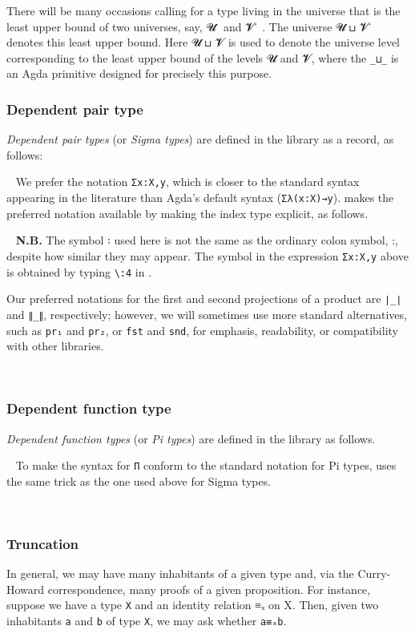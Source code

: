 \begin{code}
There will be many occasions calling for a type living in the universe that is the least upper bound of two universes, say, 𝓤 ̇ and 𝓥 ̇ . The universe 𝓤 ⊔ 𝓥 ̇ denotes this least upper bound. Here 𝓤 ⊔ 𝓥 is used to denote the universe level corresponding to the least upper bound of the levels 𝓤 and 𝓥, where the \texttt{\_⊔\_} is an Agda primitive designed for precisely this purpose.

\subsubsection{Dependent pair type}\label{dependent-pair-type}
\textit{Dependent pair types} (or \textit{Sigma types}) are defined in the \typetopology library as a record, as follows:
\ccpad

~\ccpad
We prefer the notation \texttt{Σx꞉X,y}, which is closer to the standard syntax appearing in the literature than Agda's default syntax (\texttt{Σλ(x꞉X)→y}). \mhe makes the preferred notation available by making the index type explicit, as follows.
\ccpad

~\ccpad
\textbf{N.B.} The symbol ꞉ used here is not the same as the ordinary colon symbol, :, despite how similar they may appear. The symbol in the expression \texttt{Σx꞉X,y} above is obtained by typing \texttt{\textbackslash{}:4} in \agdatwomode.

Our preferred notations for the first and second projections of a product are \texttt{∣\_∣} and \texttt{∥\_∥}, respectively; however, we will sometimes use more standard alternatives, such as \texttt{pr₁} and \texttt{pr₂}, or \texttt{fst} and \texttt{snd}, for emphasis, readability, or compatibility with other libraries.
\ccpad

~\ccpad

\subsubsection{Dependent function type}\label{dependent-function-type}

\emph{Dependent function types} (or \emph{Pi types}) are defined in the \typetopology library as follows.
\ccpad

~\ccpad
To make the syntax for \texttt{Π} conform to the standard notation for Pi types, \mhe uses the same trick as the one used above for Sigma types.
\ccpad

~\ccpad

\subsubsection{Truncation}\label{truncation}
In general, we may have many inhabitants of a given type and, via the Curry-Howard correspondence, many proofs of a given proposition. For instance, suppose we have a type \texttt{X} and an identity relation ≡ₓ on X. Then, given two inhabitants \texttt{a} and \texttt{b} of type \texttt{X}, we may ask whether \texttt{a≡ₓb}.


\end{code}
